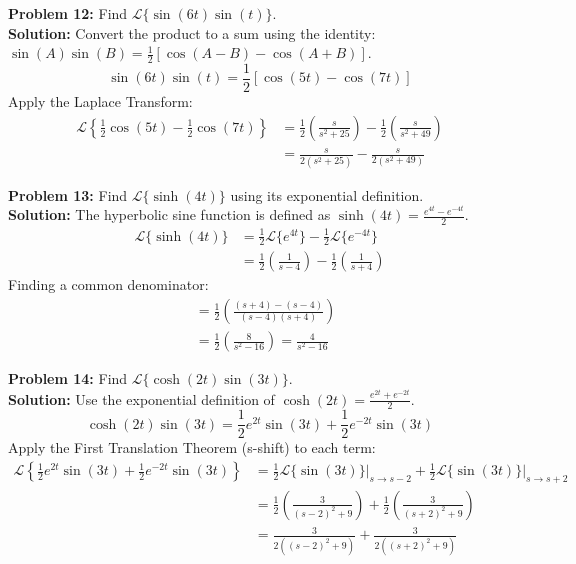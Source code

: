 \documentclass[11pt, letterpaper]{article}
\theoremstyle{definition}
\theoremstyle{remark}
\begin{document}
\vspace{1em}
\textbf{Problem 12:} Find $\mathscr{L}\{\sin(6t)\sin(t)\}$.
\vspace{0.5em} \\
\textbf{Solution:} Convert the product to a sum using the identity: $\sin(A)\sin(B) = \frac{1}{2}[\cos(A-B) - \cos(A+B)]$.
\[
\sin(6t)\sin(t) = \frac{1}{2}[\cos(5t) - \cos(7t)]
\]
Apply the Laplace Transform:
\begin{align*}
    \mathscr{L}\left\{\frac{1}{2}\cos(5t) - \frac{1}{2}\cos(7t)\right\} &= \frac{1}{2}\left(\frac{s}{s^2 + 25}\right) - \frac{1}{2}\left(\frac{s}{s^2 + 49}\right) \\[4pt]
    &= \frac{s}{2(s^2 + 25)} - \frac{s}{2(s^2 + 49)}
\end{align*}

\vspace{1em}
\textbf{Problem 13:} Find $\mathscr{L}\{\sinh(4t)\}$ using its exponential definition.
\vspace{0.5em} \\
\textbf{Solution:} The hyperbolic sine function is defined as $\sinh(4t) = \frac{e^{4t} - e^{-4t}}{2}$.
\begin{align*}
    \mathscr{L}\{\sinh(4t)\} &= \frac{1}{2}\mathscr{L}\{e^{4t}\} - \frac{1}{2}\mathscr{L}\{e^{-4t}\} \\[4pt]
    &= \frac{1}{2}\left(\frac{1}{s - 4}\right) - \frac{1}{2}\left(\frac{1}{s + 4}\right)
\end{align*}
Finding a common denominator:
\begin{align*}
    &= \frac{1}{2}\left(\frac{(s + 4) - (s - 4)}{(s - 4)(s + 4)}\right) \\[4pt]
    &= \frac{1}{2}\left(\frac{8}{s^2 - 16}\right) = \frac{4}{s^2 - 16}
\end{align*}

\vspace{1em}
\textbf{Problem 14:} Find $\mathscr{L}\{\cosh(2t)\sin(3t)\}$.
\vspace{0.5em} \\
\textbf{Solution:} Use the exponential definition of $\cosh(2t) = \frac{e^{2t} + e^{-2t}}{2}$.
\[
\cosh(2t)\sin(3t) = \frac{1}{2}e^{2t}\sin(3t) + \frac{1}{2}e^{-2t}\sin(3t)
\]
Apply the First Translation Theorem (s-shift) to each term:
\begin{align*}
    \mathscr{L}\left\{\frac{1}{2}e^{2t}\sin(3t) + \frac{1}{2}e^{-2t}\sin(3t)\right\} &= \frac{1}{2}\mathscr{L}\{\sin(3t)\}\Big|_{s \to s-2} + \frac{1}{2}\mathscr{L}\{\sin(3t)\}\Big|_{s \to s+2} \\[4pt]
    &= \frac{1}{2}\left(\frac{3}{(s - 2)^2 + 9}\right) + \frac{1}{2}\left(\frac{3}{(s + 2)^2 + 9}\right) \\[4pt]
    &= \frac{3}{2((s - 2)^2 + 9)} + \frac{3}{2((s + 2)^2 + 9)}
\end{align*}
\end{document}
